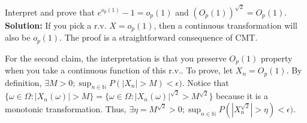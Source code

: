 \documentclass[11pt,letterpaper]{article}                  %
\begin{document}
\bigskip
\begin{problem}
Interpret and prove that $e^{o_p(1)} -1 = o_p(1)$ and $(O_p(1))^{\sqrt{2}} = O_p(1)$. \\

\textbf{Solution:} If you pick a r.v. $X = o_p(1)$, then a continuous transformation will also be $o_p(1)$. The proof is a straightforward consequence of CMT.

For the second claim, the interpretation is that you preserve $O_p(1)$ property when you take a continuous function of this r.v.. To prove, let $X_n = O_p(1)$. By definition, $\exists M>0 ; \sup_{n \in \mathbb{N}} P(|X_n|>M)<\epsilon)$. Notice that $\{\omega \in \Omega : |X_n(\omega)|>M\} = \{\omega \in \Omega : |X_n(\omega)|^{\sqrt{2}}>M^{\sqrt{2}}\}$ because it is a monotonic transformation. Thus, $\exists \eta = M^{\sqrt{2}}>0 ; \sup_{n \in \mathbb{N}} P(|X_n^{\sqrt{2}}|>\eta)<\epsilon)$.
\end{problem}
\end{document}

